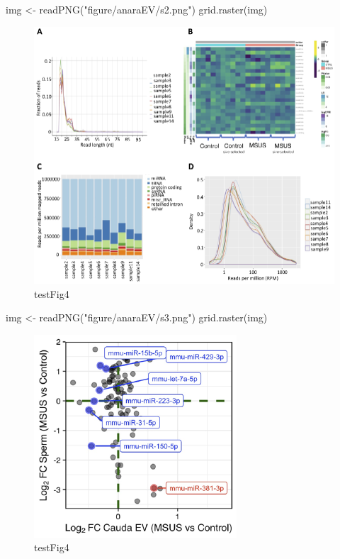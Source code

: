 \documentclass[12pt,twoside]{reedthesis}
\newenvironment{Shaded}{\begin{snugshade}}{\end{snugshade}}
\newcommand{\FunctionTok}[1]{\textcolor[rgb]{0.00,0.00,0.00}{#1}}
\newcommand{\NormalTok}[1]{#1}
\newcommand{\OtherTok}[1]{\textcolor[rgb]{0.56,0.35,0.01}{#1}}
\newcommand{\StringTok}[1]{\textcolor[rgb]{0.31,0.60,0.02}{#1}}
\begin{document}
\begin{Shaded}
\begin{Highlighting}[]
\NormalTok{img }\OtherTok{\textless{}{-}} \FunctionTok{readPNG}\NormalTok{(}\StringTok{"figure/anaraEV/s2.png"}\NormalTok{)}
\FunctionTok{grid.raster}\NormalTok{(img)}
\end{Highlighting}
\end{Shaded}
\begin{figure}

{\centering \includegraphics{thesis_files/figure-latex/sfig2-1} 

}

\caption{testFig4}\label{fig:sfig2}
\end{figure}
\begin{Shaded}
\begin{Highlighting}[]
\NormalTok{img }\OtherTok{\textless{}{-}} \FunctionTok{readPNG}\NormalTok{(}\StringTok{"figure/anaraEV/s3.png"}\NormalTok{)}
\FunctionTok{grid.raster}\NormalTok{(img)}
\end{Highlighting}
\end{Shaded}
\begin{figure}

{\centering \includegraphics{thesis_files/figure-latex/sfig3-1} 

}

\caption{testFig4}\label{fig:sfig3}
\end{figure}
\end{document}
